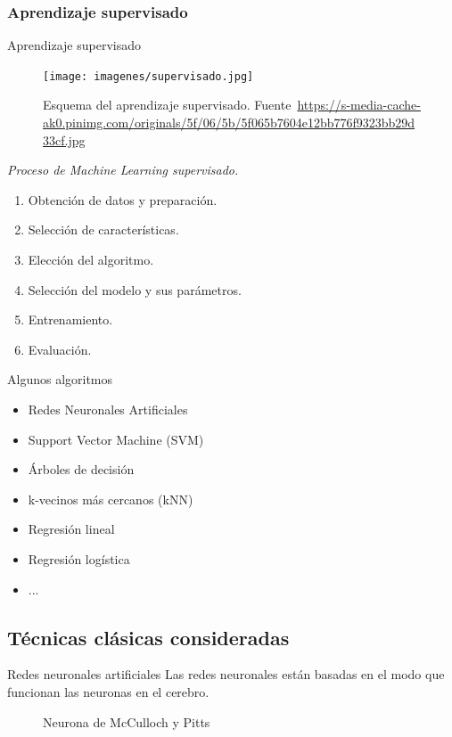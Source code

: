 \documentclass[hyperref={unicode}]{beamer}
\begin{document}
\subsubsection{Aprendizaje supervisado}
\begin{frame}{Aprendizaje supervisado}
	\begin{minipage}[b][0.7\textheight][t]{.60\textwidth}
		\begin{figure}
			\begin{center}
				\texttt{[image: imagenes/supervisado.jpg]}
				\caption{Esquema del aprendizaje supervisado. Fuente~\url{https://s-media-cache-ak0.pinimg.com/originals/5f/06/5b/5f065b7604e12bb776f9323bb29d33cf.jpg}}
			\end{center}
		\end{figure}
	\end{minipage}
	\begin{minipage}[b][0.7\textheight][t]{.37\textwidth}
		\textit{Proceso de Machine Learning supervisado.}
		\begin{enumerate}
			\item Obtención de datos y preparación.
			\item Selección de características.
			\item Elección del algoritmo.
			\item Selección del modelo y sus parámetros.
			\item Entrenamiento.
			\item Evaluación.
		\end{enumerate}
	\end{minipage}
	
\end{frame}

\begin{frame}{Algunos algoritmos}
	\begin{itemize}
		\item Redes Neuronales Artificiales
			\item Support Vector Machine (SVM)
			\item Árboles de decisión
			\item k-vecinos más cercanos (kNN)
			\item Regresión lineal
			\item Regresión logística
			\item ...
	\end{itemize}
\end{frame}



\subsection{Técnicas clásicas consideradas}
\begin{frame}{Redes neuronales artificiales}
	Las redes neuronales están basadas en el modo que funcionan las neuronas en el cerebro.\\
	
	
	\begin{figure}[htbp!]
	\centering
	\resizebox{!}{0.5\width}{\neuronaMcCullochPitts}
		
	\caption{Neurona de McCulloch y Pitts}
	\end{figure}
\end{frame}
\end{document}
